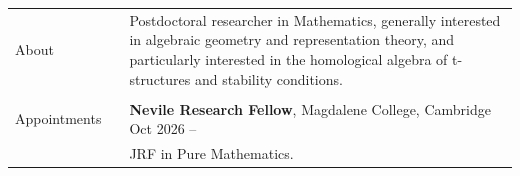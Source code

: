 \documentclass[10pt]{article}
\newcommand{\nextSection}{\\[0.5em]}
\begin{document}
\begin{longtable}{>{\raggedleft\arraybackslash}p{0.82in}>{}p{0.05in}>{}p{5.5in}}
    About
     &  & \begin{minipage}[t]{4.3in}
              Postdoctoral researcher in Mathematics, generally interested in
              algebraic geometry and representation theory, and particularly
              interested in the homological algebra of t-structures and
              stability conditions.
          \end{minipage}               \\[-0.6em]
    \nextSection%
    Appointments%
     &  & \textbf{Nevile Research Fellow}, Magdalene College, Cambridge
    \hfill Oct 2026 --                                                                     \\
     &  & JRF in Pure Mathematics.
    \nextSection%


\end{longtable}
\end{document}
